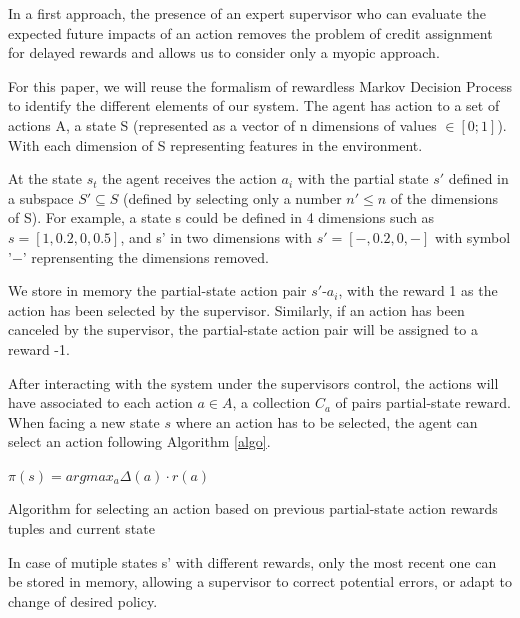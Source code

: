 \documentclass[letterpaper]{article} %
\begin{document}
In a first approach, the presence of an expert supervisor who can evaluate the
expected future impacts of an action removes the problem of credit assignment
for delayed rewards and allows us to consider only a myopic approach. 

For this paper, we will reuse the formalism of rewardless Markov Decision 
Process to identify the different elements of our system. The agent has action
to a set of actions A, a state S (represented as a vector of n dimensions of
values $\in [0;1]$). With each dimension of S representing features in the
environment.

At the state $s_{t}$ the agent receives the action $a_{i}$ with the partial
state $s'$ defined in a subspace $S' \subseteq S$ (defined by selecting only a
number $n' \leq n$ of the dimensions of S). For example, a state s could be
defined in 4 dimensions such as ${s=[1,0.2,0,0.5]}$, and s' in two dimensions with
${s'=[-,0.2,0,-]}$ with symbol '$-$' reprensenting the dimensions removed.

We store in memory the partial-state action pair $s'$-$a_{i}$, with the reward 1
as the action has been selected by the supervisor. Similarly, if an action has
been canceled by the supervisor, the partial-state action pair will be assigned to a
reward -1.

After interacting with the system under the supervisors control, the actions
will have associated to each action ${a \in A}$, a collection $C_{a}$ of pairs
partial-state reward. When facing a new state $s$ where an action has to be
selected, the agent can select an action following Algorithm \ref{algo}.

\begin{algorithm}
    \DontPrintSemicolon
    $\pi(s) = argmax_{a}\Delta(a) \cdot r(a)$

    \caption{Algorithm for selecting an action based on previous
    partial-state action rewards tuples and current state}
    \label{algo}
\end{algorithm}
In case of mutiple states s' with different rewards, only the most recent one
can be stored in memory, allowing a supervisor to correct potential errors, or
adapt to change of desired policy.
\end{document}
